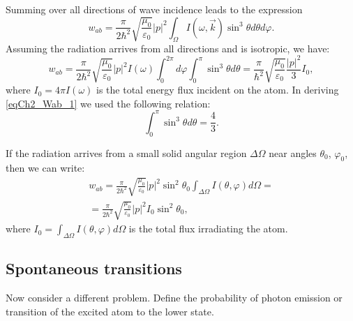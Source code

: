 Summing over all directions of wave incidence leads to the expression
\begin{equation}
w_{ab} = \frac{\pi}{2 \hbar^2}\sqrt{\frac{\mu_0}{\varepsilon_0}}
\left|p\right|^2
\int_{\Omega}I\left(\omega, \vec{k}\right)
\sin^3 \theta d \theta d \varphi.
\end{equation}
Assuming the radiation arrives from all directions and is isotropic, 
we have: 
\begin{equation}
w_{ab} = \frac{\pi}{2 \hbar^2}\sqrt{\frac{\mu_0}{\varepsilon_0}}
\left|p\right|^2 I\left(\omega\right)
\int_{0}^{2 \pi}d \varphi \int_0^{\pi}
\sin^3 \theta d \theta = 
\frac{\pi}{ \hbar^2}\sqrt{\frac{\mu_0}{\varepsilon_0}}
\frac{\left|p\right|^2}{3}I_0,
\label{eqCh2_Wab_1}
\end{equation}
where $I_0 = 4 \pi I\left(\omega\right)$ is the total energy flux incident on the atom. In deriving  \eqref{eqCh2_Wab_1}
we used the following relation:
\[
 \int_0^{\pi}
\sin^3 \theta d \theta = \frac{4}{3}.
\]

If the radiation arrives from a small solid angular region
$\Delta \Omega$ near angles $\theta_0$, $\varphi_0$, then 
we can write:  
\begin{eqnarray}
w_{ab} = \frac{\pi}{2 \hbar^2}\sqrt{\frac{\mu_0}{\varepsilon_0}}
\left|p\right|^2 \sin^2 \theta_0
\int_{\Delta \Omega} I\left(\theta, \varphi\right)
d \Omega = 
\nonumber \\
= 
\frac{\pi}{2 \hbar^2}\sqrt{\frac{\mu_0}{\varepsilon_0}}
\left|p\right|^2  I_0 \sin^2 \theta_0,
\label{eqCh2_Wab_2}
\end{eqnarray}
where $I_0 = \int_{\Delta \Omega} I\left(\theta, \varphi\right)
d \Omega$ is the total flux irradiating the atom.

\subsection{Spontaneous transitions}
Now consider a different problem. Define the probability of photon emission
or transition of the excited atom to the lower state.  

